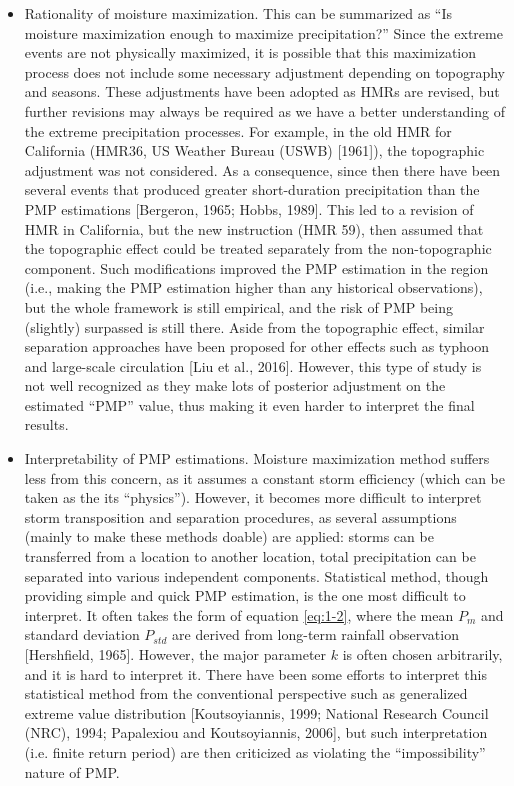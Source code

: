 \begin{itemize}
\item Rationality of moisture maximization. This can be summarized as ``Is moisture maximization enough to maximize precipitation?'' Since the extreme events are not physically maximized, it is possible that this maximization process does not include some necessary adjustment depending on topography and seasons. These adjustments have been adopted as HMRs are revised, but further revisions may always be required as we have a better understanding of the extreme precipitation processes. For example, in the old HMR for California (HMR36, US Weather Bureau (USWB) [1961]), the topographic adjustment was not considered. As a consequence, since then there have been several events that produced greater short-duration precipitation than the PMP estimations [Bergeron, 1965; Hobbs, 1989]. This led to a revision of HMR in California, but the new instruction (HMR 59), then assumed that the topographic effect could be treated separately from the non-topographic component. Such modifications improved the PMP estimation in the region (i.e., making the PMP estimation higher than any historical observations), but the whole framework is still empirical, and the risk of PMP being (slightly) surpassed is still there. Aside from the topographic effect, similar separation approaches have been proposed for other effects such as typhoon and large-scale circulation [Liu et al., 2016]. However, this type of study is not well recognized as they make lots of posterior adjustment on the estimated ``PMP'' value, thus making it even harder to interpret the final results.

\item Interpretability of PMP estimations. Moisture maximization method suffers less from this concern, as it assumes a constant storm efficiency (which can be taken as the its ``physics''). However, it becomes more difficult to interpret storm transposition and separation procedures, as several assumptions (mainly to make these methods doable) are applied: storms can be transferred from a location to another location, total precipitation can be separated into various independent components. Statistical method, though providing simple and quick PMP estimation, is the one most difficult to interpret. It often takes the form of equation \ref{eq:1-2}, where the mean $P_{m}$ and standard deviation $P_{std}$ are derived from long-term rainfall observation [Hershfield, 1965]. However, the major parameter $k$ is often chosen arbitrarily, and it is hard to interpret it. There have been some efforts to interpret this statistical method from the conventional perspective such as generalized extreme value distribution [Koutsoyiannis, 1999; National Research Council (NRC), 1994; Papalexiou and Koutsoyiannis, 2006], but such interpretation (i.e. finite return period) are then criticized as violating the ``impossibility'' nature of PMP.


\end{itemize}
